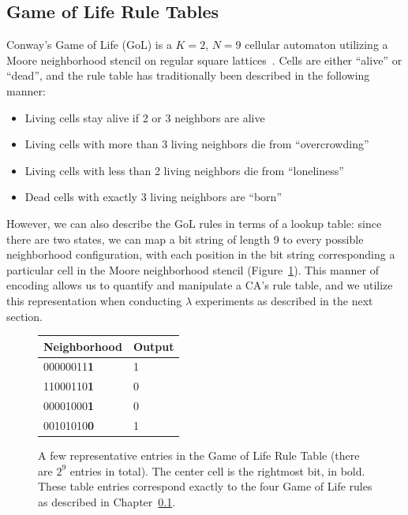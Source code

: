 \documentclass[a4paper,11pt,twoside]{report}
\begin{document}
\subsection{Game of Life Rule Tables}
\label{ch3:subsec_gol}
Conway's Game of Life (GoL) is a $K=2$, $N=9$ cellular automaton utilizing a Moore neighborhood stencil on regular square lattices~\cite{ga70}. Cells are either ``alive'' or ``dead'', and the rule table has traditionally been described in the following manner:

\begin{itemize}
\item Living cells stay alive if 2 or 3 neighbors are alive
\item Living cells with more than 3 living neighbors die from ``overcrowding''
\item Living cells with less than 2 living neighbors die from ``loneliness''
\item Dead cells with exactly 3 living neighbors are ``born''
\end{itemize}

However, we can also describe the GoL rules in terms of a lookup table: since there are two states, we can map a bit string of length 9 to every possible neighborhood configuration, with each position in the bit string corresponding a particular cell in the Moore neighborhood stencil (Figure~\ref{fig:gol_table}). This manner of encoding allows us to quantify and manipulate a CA's rule table, and we utilize this representation when conducting $\lambda$ experiments as described in the next section.

\begin{figure}[htp]
\centering
\begin{tabular}{| l | l |}
\hline
Neighborhood & Output \\
\hline
00000011\textbf{1} & 1 \\
\hline
11000110\textbf{1} & 0 \\
\hline
00001000\textbf{1} & 0 \\
\hline
00101010\textbf{0} & 1 \\
\hline
\end{tabular}
\caption[Game of Life Rule Table]{
	A few representative entries in the Game of Life Rule Table (there are $2^9$ entries in total). The center cell is the rightmost bit, in bold. These table entries correspond exactly to the four Game of Life rules as described in Chapter~\ref{ch3:subsec_gol}.
}
\label{fig:gol_table}
\end{figure}
\end{document}
